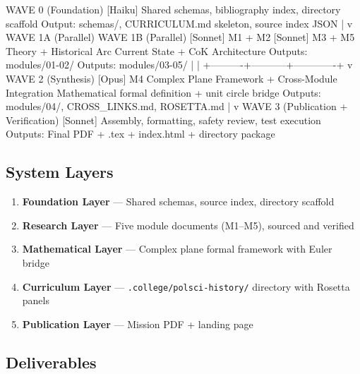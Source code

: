 \documentclass[11pt,letterpaper]{article}
\begin{document}
\begin{asciibox}
WAVE 0 (Foundation)
  [Haiku] Shared schemas, bibliography index, directory scaffold
  Output: schemas/, CURRICULUM.md skeleton, source index JSON
       |
       v
WAVE 1A (Parallel)                 WAVE 1B (Parallel)
  [Sonnet] M1 + M2                   [Sonnet] M3 + M5
  Theory + Historical Arc             Current State + CoK Architecture
  Outputs: modules/01-02/             Outputs: modules/03-05/
       |                                    |
       +----------+-----------+-------------+
                  v
WAVE 2 (Synthesis)
  [Opus] M4 Complex Plane Framework + Cross-Module Integration
  Mathematical formal definition + unit circle bridge
  Outputs: modules/04/, CROSS_LINKS.md, ROSETTA.md
                  |
                  v
WAVE 3 (Publication + Verification)
  [Sonnet] Assembly, formatting, safety review, test execution
  Outputs: Final PDF + .tex + index.html + directory package
\end{asciibox}

\subsection{System Layers}

\begin{enumerate}
  \item \textbf{Foundation Layer} --- Shared schemas, source index, directory scaffold
  \item \textbf{Research Layer} --- Five module documents (M1--M5), sourced and verified
  \item \textbf{Mathematical Layer} --- Complex plane formal framework with Euler bridge
  \item \textbf{Curriculum Layer} --- \texttt{.college/polsci-history/} directory with Rosetta panels
  \item \textbf{Publication Layer} --- Mission PDF + landing page
\end{enumerate}

\subsection{Deliverables}
\end{document}
